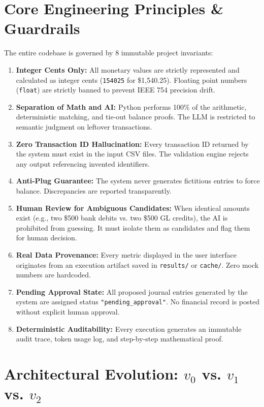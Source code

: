 \documentclass[10pt,a4paper]{article}
\begin{document}
\section{Core Engineering Principles \& Guardrails}

The entire codebase is governed by 8 immutable project invariants:
\begin{enumerate}
    \item \textbf{Integer Cents Only:} All monetary values are strictly represented and calculated as integer cents (\texttt{154025} for \$1,540.25). Floating point numbers (\texttt{float}) are strictly banned to prevent IEEE 754 precision drift.
    \item \textbf{Separation of Math and AI:} Python performs 100\% of the arithmetic, deterministic matching, and tie-out balance proofs. The LLM is restricted to semantic judgment on leftover transactions.
    \item \textbf{Zero Transaction ID Hallucination:} Every transaction ID returned by the system must exist in the input CSV files. The validation engine rejects any output referencing invented identifiers.
    \item \textbf{Anti-Plug Guarantee:} The system never generates fictitious entries to force balance. Discrepancies are reported transparently.
    \item \textbf{Human Review for Ambiguous Candidates:} When identical amounts exist (e.g., two \$500 bank debits vs. two \$500 GL credits), the AI is prohibited from guessing. It must isolate them as candidates and flag them for human decision.
    \item \textbf{Real Data Provenance:} Every metric displayed in the user interface originates from an execution artifact saved in \texttt{results/} or \texttt{cache/}. Zero mock numbers are hardcoded.
    \item \textbf{Pending Approval State:} All proposed journal entries generated by the system are assigned status \texttt{"pending\_approval"}. No financial record is posted without explicit human approval.
    \item \textbf{Deterministic Auditability:} Every execution generates an immutable audit trace, token usage log, and step-by-step mathematical proof.
\end{enumerate}

\section{Architectural Evolution: $v_0$ vs. $v_1$ vs. $v_2$}
\end{document}
